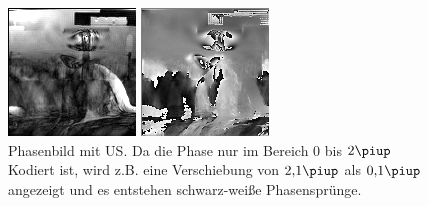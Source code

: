 \documentclass[
    11pt,
    ngerman
]{scrreprt}
\begin{document}
\begin{figure}[htbp]
    \begin{minipage}[htbp]{.48\textwidth}
        \centering
        \includegraphics[width=.8\textwidth]{Abbildungen/2014-11-27_18_1_amp_kontrast.png}
        \caption{%
            Amplitudenbild mit US. Oben im Bild sind der Spiegel und Verwirbelungen im Wasser durch den Ultraschall zu sehen. Auf Höhe der Mitte sind Bildstörungen zu erkennen.
        }
        \label{fig:prob1_ampl_US}
    \end{minipage}
    \hfill
    \begin{minipage}[htbp]{.48\textwidth}
        \centering
        \includegraphics[width=.8\textwidth]{Abbildungen/2014-11-27_19_1_phase.png}
        \caption{%
            Phasenbild mit US. Da die Phase nur im Bereich 0 bis $2\piup$ Kodiert ist, wird z.B. eine Verschiebung von $\num{2.1}\piup$ als $\num{.1}\piup$ angezeigt und es entstehen schwarz-weiße Phasensprünge.
        }
        \label{fig:prob1_phas_US}
    \end{minipage}
\end{figure}
\end{document}
